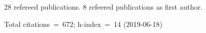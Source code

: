 28 refereed publications. 8 refeered publications as first author.

Total citations~=~672; h-index~=~14 (2019-06-18)